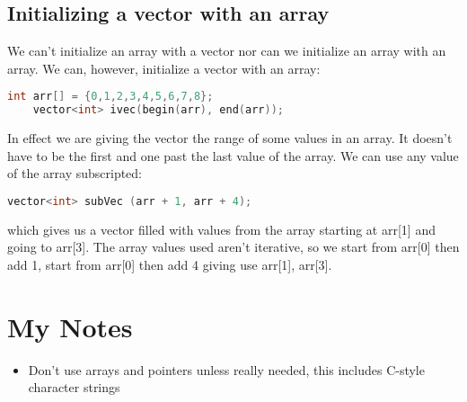 \documentclass[12pt, a4paper]{report}
\begin{document}
\subsection{Initializing a vector with an array}
We can't initialize an array with a vector nor can we initialize an array with an array.
We can, however, initialize a vector with an array:
\begin{lstlisting}[language=C++]
	int arr[] = {0,1,2,3,4,5,6,7,8};
	vector<int> ivec(begin(arr), end(arr));
\end{lstlisting}
In effect we are giving the vector the range of some values in an array.
It doesn't have to be the first and one past the last value of the array.
We can use any value of the array subscripted:
\begin{lstlisting}[language=C++]
	vector<int> subVec (arr + 1, arr + 4);
\end{lstlisting}
which gives us a vector filled with values from the array starting at arr[1] and going to arr[3].
The array values used aren't iterative, so we start from arr[0] then add 1, start from arr[0] then add 4 giving use arr[1], arr[3].
\section{My Notes}
\begin{itemize}
	\item Don't use arrays and pointers unless really needed, this includes C-style character strings
\end{itemize}


 
\end{document}
